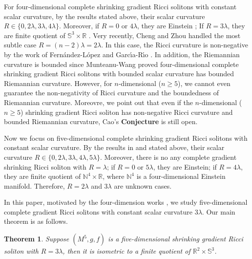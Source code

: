 \documentclass[12pt]{amsart}
\newtheorem{theo}{Theorem}[section]
\begin{document}
	
	\smallskip	
For four-dimensional complete shrinking gradient Ricci solitons with constant scalar curvature, by the results stated above, their scalar curvature  $R\in\{0, 2\lambda, 3\lambda,  4\lambda\}$. Moreover, if $R=0$ or $ 4\lambda$, they are Einstein \cite{Petersen-Wylie}; If $R=3\lambda$, they are finite quotient of $\mathbb{S}^{3}\times\mathbb{R}$ \cite{FR16}.
	Very recently, Cheng and Zhou \cite{Cheng-Zhou} handled the most subtle case $R=(n-2)\lambda=2\lambda$. In this case, the Ricci curvature is non-negative by the work of Fern\'{a}ndez-L\'{o}pez and Garc\'\i a-R\'\i o \cite{FR16}.
	In addition, the Riemannian curvature is bounded since Munteanu-Wang  \cite{Munteanu-Wang3}  proved four-dimensional complete shrinking gradient Ricci solitons with bounded scalar curvature has bounded Riemannian curvature.
	However, for $n$-dimensional ($n\geq 5$), we cannot even guarantee the non-negativity of Ricci curvature and the boundedness of Riemannian curvature.
	Moreovre, we point out that even if the $n$-dimensional ($n\geq 5$) shrinking gradient Ricci soliton has non-negative Ricci curvature and bounded Riemannian curvature, Cao's \textbf{Conjecture} is still open.
	
	\smallskip	
	Now we focus on five-dimensional complete shrinking gradient Ricci solitons with constant scalar curvature. By the results in \cite{FR16} and \cite{Petersen-Wylie2} stated above,
	their scalar curvature $R\in \{0,  2\lambda, 3\lambda, 4\lambda, 5\lambda\}$.  Moreover,
	there is no any complete gradient shrinking Ricci soliton  with $R=\lambda$; if $R=0$ or $ 5\lambda$, they are Einstein; if $R=4\lambda$,  they are finite quotient of $\mathbb{N}^{4}\times\mathbb{R}$, where $\mathbb{N}^4$ is a four-dimensional Einstein manifold.  Therefore, $R=2\lambda$ and $3\lambda $ are unknown cases.
	
	\smallskip	
	In this paper, motivated by the four-dimension works \cite{Cheng-Zhou,Petersen-Wylie,FR16}, we study five-dimensional complete gradient Ricci solitons with constant scalar curvature $3\lambda $.
	Our main theorem is as follows.
	\begin{theo}\label{main}
		Suppose $(M^5, g, f)$ is a five-dimensional shrinking gradient Ricci soliton with $R=3\lambda$, then it is isometric to a finite quotient of $\mathbb{R}^2 \times \mathbb{S}^3$.
	\end{theo}
	
\end{document}
